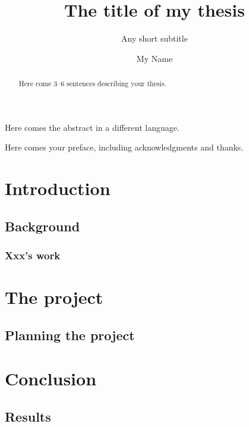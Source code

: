 \documentclass[UKenglish]{uiomasterthesis}  %
\title{The title of my thesis}        %
\subtitle{Any short subtitle}         %
\author{My Name}                      %
\begin{document}
\uiomasterfp[dept={Department of Physics},  %
  program={Physics},                        %
  supervisor={The Name},                    %
  long]                                     %

\frontmatter{}
\begin{abstract}
  Here come 3--6 sentences describing your thesis.
\end{abstract}

\begin{xabstract}[Sammendrag]               %
  Here comes the abstract in a different language.
\end{xabstract}

\tableofcontents{}                          %
\listoffigures{}                            %
\listoftables{}                             %

\begin{preface}
  Here comes your preface, including acknowledgments and thanks.
\end{preface}

\mainmatter{}
\part{Introduction}                   %
\chapter{Background}                  %
\section{Xxx's work}                  %

\part{The project}                    %
\chapter{Planning the project}        %

\part{Conclusion}                     %
\chapter{Results}                     %

\backmatter{}
\printbibliography{}
\end{document}
